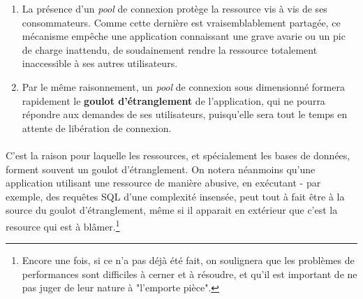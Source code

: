 {  \begin{enumerate}
    \item La présence d'un \textit{pool} de connexion protège la ressource vis à vis de ses
    consommateurs. Comme cette dernière est vraisemblablement partagée, ce mécanisme empêche une
    application connaissant une grave avarie ou un pic de charge inattendu, de soudainement rendre
    la ressource totalement inaccessible à ses autres utilisateurs.
    \item Par le même raisonnement, un \textit{pool} de connexion sous dimensionné formera
    rapidement le \textbf{goulot d'étranglement} de l'application, qui ne pourra répondre aux
    demandes de ses utilisateurs, puisqu'elle sera tout le temps en attente de libération de
    connexion.
  \end{enumerate}

  \paragraph{} C'est la raison pour laquelle les ressources, et spécialement les bases de données,
  forment souvent un goulot d'étranglement. On notera néanmoins qu'une application
  utilisant une ressource de manière abusive, en exécutant - par exemple, des requêtes SQL d'une
  complexité insensée, peut tout à fait être à la source du goulot d'étranglement, même si il
  apparait en extérieur que c'est la resource qui est à blâmer.\footnote{Encore une fois, si ce n'a
  pas déjà été fait, on soulignera que les problèmes de performances sont difficiles à cerner et à
  résoudre, et qu'il est important de ne pas juger de leur nature à "l'emporte pièce".}

}



